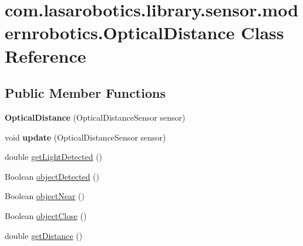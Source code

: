 \hypertarget{classcom_1_1lasarobotics_1_1library_1_1sensor_1_1modernrobotics_1_1_optical_distance}{}\section{com.\+lasarobotics.\+library.\+sensor.\+modernrobotics.\+Optical\+Distance Class Reference}
\label{classcom_1_1lasarobotics_1_1library_1_1sensor_1_1modernrobotics_1_1_optical_distance}
\subsection*{Public Member Functions}
\begin{DoxyCompactItemize}
\item 
\hypertarget{classcom_1_1lasarobotics_1_1library_1_1sensor_1_1modernrobotics_1_1_optical_distance_ad4009ff3381a553cc78787dc3932c7ac}{}{\bfseries Optical\+Distance} (Optical\+Distance\+Sensor sensor)\label{classcom_1_1lasarobotics_1_1library_1_1sensor_1_1modernrobotics_1_1_optical_distance_ad4009ff3381a553cc78787dc3932c7ac}

\item 
\hypertarget{classcom_1_1lasarobotics_1_1library_1_1sensor_1_1modernrobotics_1_1_optical_distance_ae58a79f371560087ea2d9ab2ec3f61b8}{}void {\bfseries update} (Optical\+Distance\+Sensor sensor)\label{classcom_1_1lasarobotics_1_1library_1_1sensor_1_1modernrobotics_1_1_optical_distance_ae58a79f371560087ea2d9ab2ec3f61b8}

\item 
double \hyperlink{classcom_1_1lasarobotics_1_1library_1_1sensor_1_1modernrobotics_1_1_optical_distance_a0694b6194e93fb22bcebeb0aff66486b}{get\+Light\+Detected} ()
\item 
Boolean \hyperlink{classcom_1_1lasarobotics_1_1library_1_1sensor_1_1modernrobotics_1_1_optical_distance_a366a12fd4ccfb876a22464b4c6096899}{object\+Detected} ()
\item 
Boolean \hyperlink{classcom_1_1lasarobotics_1_1library_1_1sensor_1_1modernrobotics_1_1_optical_distance_ab77075ad6e8a0523a6f77b7fbc54a2da}{object\+Near} ()
\item 
Boolean \hyperlink{classcom_1_1lasarobotics_1_1library_1_1sensor_1_1modernrobotics_1_1_optical_distance_ac3d175c6bfb8bbcb8abb50e2febbe6fc}{object\+Close} ()
\item 
double \hyperlink{classcom_1_1lasarobotics_1_1library_1_1sensor_1_1modernrobotics_1_1_optical_distance_afc702503dd61db5ae033af322a474cf9}{get\+Distance} ()
\end{DoxyCompactItemize}


